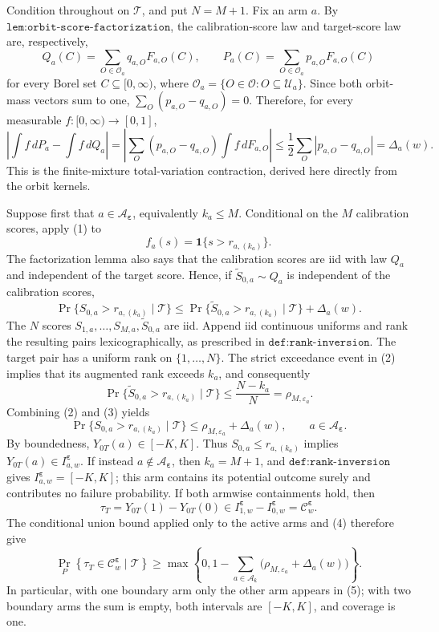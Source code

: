 Condition throughout on \(\mathcal T\), and put \(N=M+1\). Fix an arm \(a\). By \(\texttt{lem:orbit-score-factorization}\), the calibration-score law and target-score law are, respectively,
\[
Q_a(C)=\sum_{O\in\mathcal O_a}q_{a,O}F_{a,O}(C),
\qquad
P_a(C)=\sum_{O\in\mathcal O_a}p_{a,O}F_{a,O}(C)
\]
for every Borel set \(C\subseteq[0,\infty)\), where \(\mathcal O_a=\{O\in\mathcal O:O\subseteq\mathcal U_a\}\). Since both orbit-mass vectors sum to one, \(\sum_O(p_{a,O}-q_{a,O})=0\). Therefore, for every measurable \(f:[0,\infty)\to[0,1]\),
\[
\left|\int f\,dP_a-\int f\,dQ_a\right|
=\left|\sum_O(p_{a,O}-q_{a,O})\int f\,dF_{a,O}\right|
\le\frac12\sum_O|p_{a,O}-q_{a,O}|
=\Delta_a(w).
\tag{1}
\]
This is the finite-mixture total-variation contraction, derived here directly from the orbit kernels.

Suppose first that \(a\in\mathcal A_{\boldsymbol\varepsilon}\), equivalently \(k_a\le M\). Conditional on the \(M\) calibration scores, apply (1) to
\[
f_a(s)=\mathbf 1\{s>r_{a,(k_a)}\}.
\]
The factorization lemma also says that the calibration scores are iid with law \(Q_a\) and independent of the target score. Hence, if \(\widetilde S_{0,a}\sim Q_a\) is independent of the calibration scores,
\[
\Pr\{S_{0,a}>r_{a,(k_a)}\mid\mathcal T\}
\le\Pr\{\widetilde S_{0,a}>r_{a,(k_a)}\mid\mathcal T\}+\Delta_a(w).
\tag{2}
\]
The \(N\) scores \(S_{1,a},\ldots,S_{M,a},\widetilde S_{0,a}\) are iid. Append iid continuous uniforms and rank the resulting pairs lexicographically, as prescribed in \(\texttt{def:rank-inversion}\). The target pair has a uniform rank on \(\{1,\ldots,N\}\). The strict exceedance event in (2) implies that its augmented rank exceeds \(k_a\), and consequently
\[
\Pr\{\widetilde S_{0,a}>r_{a,(k_a)}\mid\mathcal T\}
\le\frac{N-k_a}{N}=\rho_{M,\varepsilon_a}.
\tag{3}
\]
Combining (2) and (3) yields
\[
\Pr\{S_{0,a}>r_{a,(k_a)}\mid\mathcal T\}
\le\rho_{M,\varepsilon_a}+\Delta_a(w),
\qquad a\in\mathcal A_{\boldsymbol\varepsilon}.
\tag{4}
\]
By boundedness, \(Y_{0T}(a)\in[-K,K]\). Thus \(S_{0,a}\le r_{a,(k_a)}\) implies \(Y_{0T}(a)\in I^{\boldsymbol\varepsilon}_{a,w}\). If instead \(a\notin\mathcal A_{\boldsymbol\varepsilon}\), then \(k_a=M+1\), and \(\texttt{def:rank-inversion}\) gives \(I^{\boldsymbol\varepsilon}_{a,w}=[-K,K]\); this arm contains its potential outcome surely and contributes no failure probability. If both armwise containments hold, then
\[
\tau_T=Y_{0T}(1)-Y_{0T}(0)\in I^{\boldsymbol\varepsilon}_{1,w}-I^{\boldsymbol\varepsilon}_{0,w}=\mathcal C^{\boldsymbol\varepsilon}_w.
\]
The conditional union bound applied only to the active arms and (4) therefore give
\[
\Pr_P\!\left\{\tau_T\in\mathcal C^{\boldsymbol\varepsilon}_w\mid\mathcal T\right\}
\ge\max\!\left\{0,1-\sum_{a\in\mathcal A_{\boldsymbol\varepsilon}}\bigl(\rho_{M,\varepsilon_a}+\Delta_a(w)\bigr)\right\}.
\tag{5}
\]
In particular, with one boundary arm only the other arm appears in (5); with two boundary arms the sum is empty, both intervals are \([-K,K]\), and coverage is one.

